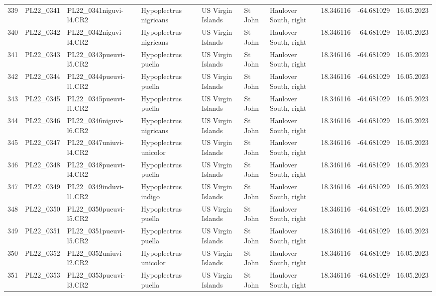 \begin{table}[ht]
\begin{tabular}{rlllllllll}
  339 & PL22\_0341 & PL22\_0341niguvi-l4.CR2 & Hypoplectrus nigricans & US Virgin Islands & St John & Haulover South, right & 18.346116 & -64.681029 & 16.05.2023 \\ 
  340 & PL22\_0342 & PL22\_0342niguvi-l4.CR2 & Hypoplectrus nigricans & US Virgin Islands & St John & Haulover South, right & 18.346116 & -64.681029 & 16.05.2023 \\ 
  341 & PL22\_0343 & PL22\_0343pueuvi-l5.CR2 & Hypoplectrus puella & US Virgin Islands & St John & Haulover South, right & 18.346116 & -64.681029 & 16.05.2023 \\ 
  342 & PL22\_0344 & PL22\_0344pueuvi-l1.CR2 & Hypoplectrus puella & US Virgin Islands & St John & Haulover South, right & 18.346116 & -64.681029 & 16.05.2023 \\ 
  343 & PL22\_0345 & PL22\_0345pueuvi-l1.CR2 & Hypoplectrus puella & US Virgin Islands & St John & Haulover South, right & 18.346116 & -64.681029 & 16.05.2023 \\ 
  344 & PL22\_0346 & PL22\_0346niguvi-l6.CR2 & Hypoplectrus nigricans & US Virgin Islands & St John & Haulover South, right & 18.346116 & -64.681029 & 16.05.2023 \\ 
  345 & PL22\_0347 & PL22\_0347uniuvi-l4.CR2 & Hypoplectrus unicolor & US Virgin Islands & St John & Haulover South, right & 18.346116 & -64.681029 & 16.05.2023 \\ 
  346 & PL22\_0348 & PL22\_0348pueuvi-l4.CR2 & Hypoplectrus puella & US Virgin Islands & St John & Haulover South, right & 18.346116 & -64.681029 & 16.05.2023 \\ 
  347 & PL22\_0349 & PL22\_0349induvi-l1.CR2 & Hypoplectrus indigo & US Virgin Islands & St John & Haulover South, right & 18.346116 & -64.681029 & 16.05.2023 \\ 
  348 & PL22\_0350 & PL22\_0350pueuvi-l5.CR2 & Hypoplectrus puella & US Virgin Islands & St John & Haulover South, right & 18.346116 & -64.681029 & 16.05.2023 \\ 
  349 & PL22\_0351 & PL22\_0351pueuvi-l5.CR2 & Hypoplectrus puella & US Virgin Islands & St John & Haulover South, right & 18.346116 & -64.681029 & 16.05.2023 \\ 
  350 & PL22\_0352 & PL22\_0352uniuvi-l2.CR2 & Hypoplectrus unicolor & US Virgin Islands & St John & Haulover South, right & 18.346116 & -64.681029 & 16.05.2023 \\ 
  351 & PL22\_0353 & PL22\_0353pueuvi-l3.CR2 & Hypoplectrus puella & US Virgin Islands & St John & Haulover South, right & 18.346116 & -64.681029 & 16.05.2023 \\ 

\end{tabular}
\end{table}
